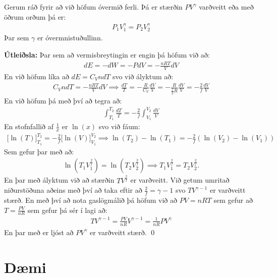 \ifdefined \wholebook \else\documentclass[oneside]{book}\usepackage{EdlBook}\graphicspath{{figures/}}
\begin{document}
\begin{tcolorbox}
\begin{theorem}
Gerum ráð fyrir að við höfum óvermið ferli. Þá er stærðin $PV^\gamma$ varðveitt eða með öðrum orðum þá er:
\begin{align*}
    P_1V_1^\gamma = P_2 V_2^\gamma
\end{align*}
Þar sem $\gamma$ er óvermnistuðullinn.
\end{theorem}
\end{tcolorbox}


\textbf{Útleiðsla:} Þar sem að vermisbreytingin er engin þá höfum við að:
\begin{align*}
    dE = -dW = -PdV = -\frac{nRT}{V}dV
\end{align*}
En við höfum líka að $dE = C_Vn dT$ svo við ályktum að:
\begin{align*}
    C_V n dT = - \frac{nRT}{V}dV \implies \frac{dT}{T} = - \frac{R}{C_V} \frac{dV}{V} = - \frac{R}{\frac{f}{2}R}\frac{dV}{V} = - \frac{2}{f} \frac{dV}{V}
\end{align*}
En við höfum þá með því að tegra að:
\begin{align*}
    \int_{T_1}^{T_2} \frac{dT}{T} = - \frac{2}{f}\int_{V_1}^{V_2} \frac{dV}{V}
\end{align*}
En stofnfallið af $\frac{1}{x}$ er $\ln(x)$ svo við fáum:
\begin{align*}
    \Big[ \ln(T) \Big]_{T_1}^{T_2} = - \frac{2}{f} \Big[ \ln(V) \Big]_{V_1}^{V_2} \implies \ln(T_2)-\ln(T_1) = -\frac{2}{f}\left( \ln(V_2) - \ln(V_1) \right)
\end{align*}
Sem gefur þar með að:
\begin{align*}
    \ln(T_1 V_1^{\frac{2}{f}}) = \ln(T_2 V_2^{\frac{2}{f}}) \implies T_1 V_1^{\frac{2}{f}} = T_2 V_2^{\frac{2}{f}}.
\end{align*}
En þar með ályktum við að stærðin $TV^{\frac{2}{f}}$ er varðveitt. Við getum umritað niðurstöðuna aðeins með því að taka eftir að $\frac{2}{f} = \gamma - 1$ svo $TV^{\gamma -1}$ er varðveitt stærð. En með því að nota gaslögmálið þá höfum við að $PV = nRT$ sem gefur að $T = \frac{PV}{nR}$ sem gefur þá sér í lagi að:
\begin{align*}
    TV^{\gamma -1} = \frac{PV}{nR}V^{\gamma -1} = \frac{1}{nR} PV^{\gamma}
\end{align*}
En þar með er ljóst að $PV^\gamma$ er varðveitt stærð. \qed

\newpage

\section{Dæmi}
\end{document}
